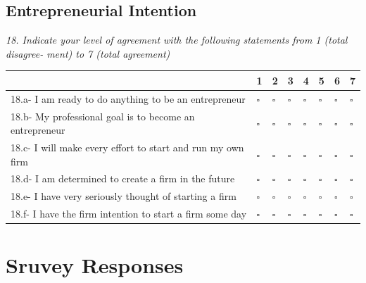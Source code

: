 \subsection{Entrepreneurial Intention}
\emph{18. Indicate your level of agreement with the following statements from 1 (total disagree- ment) to 7 (total agreement)}

\begin{table}[H]
\scriptsize	
\centering

\begin{tabular}{p{10cm}lllllll}
\toprule
                                                                                                                                     & 1         & 2         & 3         & 4         & 5         & 6         & 7         \\ \midrule
18.a- I am ready to do anything to be an entrepreneur       & $\square$ & $\square$ & $\square$ & $\square$ & $\square$ & $\square$ & $\square$ \\
18.b- My professional goal is to become an entrepreneur     & $\square$ & $\square$ & $\square$ & $\square$ & $\square$ & $\square$ & $\square$ \\
18.c- I will make every effort to start and run my own firm & $\square$ & $\square$ & $\square$ & $\square$ & $\square$ & $\square$ & $\square$ \\
18.d- I am determined to create a firm in the future        & $\square$ & $\square$ & $\square$ & $\square$ & $\square$ & $\square$ & $\square$ \\
18.e- I have very seriously thought of starting a firm      & $\square$ & $\square$ & $\square$ & $\square$ & $\square$ & $\square$ & $\square$ \\ 
18.f- I have the firm intention to start a firm some day    & $\square$ & $\square$ & $\square$ & $\square$ & $\square$ & $\square$ & $\square$ \\ \bottomrule

\end{tabular}
\end{table}


\newpage
\section{Sruvey Responses}\label{section:Appendix Two}

